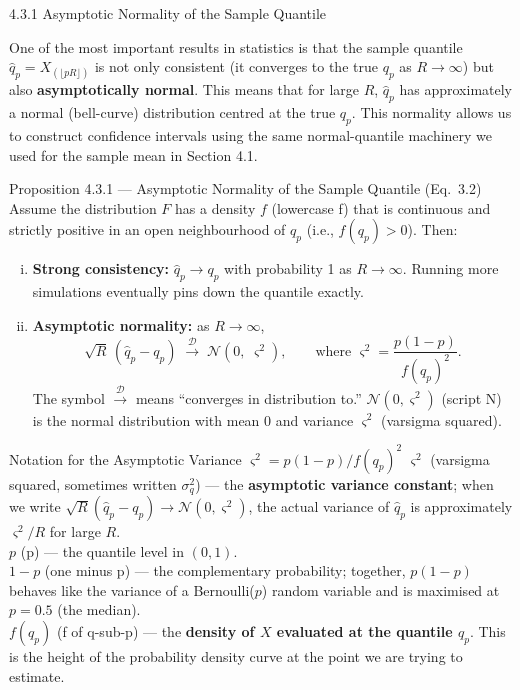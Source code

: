 \documentclass[aspectratio=169,10pt]{beamer}
\begin{document}
\begin{frame}[allowframebreaks]{4.3.1 Asymptotic Normality of the Sample Quantile}

One of the most important results in statistics is that the sample quantile
$\hat{q}_p = X_{(\lfloor pR \rfloor)}$ is not only consistent (it converges to
the true $q_p$ as $R \to \infty$) but also \textbf{asymptotically normal}.  This
means that for large $R$, $\hat{q}_p$ has approximately a normal (bell-curve)
distribution centred at the true $q_p$.  This normality allows us to construct
confidence intervals using the same normal-quantile machinery we used for the
sample mean in Section 4.1.

\begin{block}{Proposition 4.3.1 --- Asymptotic Normality of the Sample Quantile (Eq.\ 3.2)}
  Assume the distribution $F$ has a density $f$ (lowercase f) that is continuous
  and strictly positive in an open neighbourhood of $q_p$ (i.e., $f(q_p) > 0$).
  Then:
  \begin{enumerate}[(i)]
    \item \textbf{Strong consistency:} $\hat{q}_p \to q_p$ with probability 1 as
      $R \to \infty$.  Running more simulations eventually pins down the quantile
      exactly.
    \item \textbf{Asymptotic normality:} as $R \to \infty$,
      \[
        \sqrt{R}\,(\hat{q}_p - q_p)
          \;\xrightarrow{\mathcal{D}}\;
          \mathcal{N}\!\left(0,\; \varsigma^2\right),
        \qquad \text{where } \varsigma^2 = \frac{p(1-p)}{f(q_p)^2}.
      \]
      The symbol $\xrightarrow{\mathcal{D}}$ means ``converges in distribution to.''
      $\mathcal{N}(0, \varsigma^2)$ (script N) is the normal distribution with
      mean 0 and variance $\varsigma^2$ (varsigma squared).
  \end{enumerate}
\end{block}

\begin{block}{Notation for the Asymptotic Variance $\varsigma^2 = p(1-p)/f(q_p)^2$}
  $\varsigma^2$ (varsigma squared, sometimes written $\sigma_q^2$) --- the
  \textbf{asymptotic variance constant}; when we write $\sqrt{R}(\hat{q}_p - q_p)
  \to \mathcal{N}(0, \varsigma^2)$, the actual variance of $\hat{q}_p$ is
  approximately $\varsigma^2/R$ for large $R$.\\[4pt]
  $p$ (p) --- the quantile level in $(0,1)$.\\[4pt]
  $1-p$ (one minus p) --- the complementary probability; together, $p(1-p)$
  behaves like the variance of a Bernoulli($p$) random variable and is maximised
  at $p = 0.5$ (the median).\\[4pt]
  $f(q_p)$ (f of q-sub-p) --- the \textbf{density of $X$ evaluated at the
  quantile $q_p$}.  This is the height of the probability density curve at the
  point we are trying to estimate.
\end{block}


\end{frame}
\end{document}
